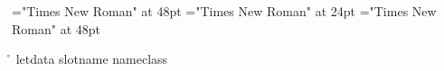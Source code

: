 \font\nameletData="Times New Roman" at 48pt
\font\slotnameletData="Times New Roman" at 24pt
\font{}="Times New Roman" at 48pt
 \r\n
{} letdata 
\slotnameletData slotname \nameletData nameclass 

\bye
